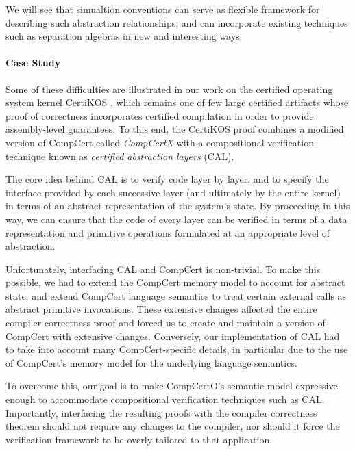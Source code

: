 We will see that simualtion conventions
can serve as flexible framework for describing
such abstraction relationships,
and can incorporate existing techniques
such as separation algebras \cite{sepalg}
in new and interesting ways.



\paragraph{Case Study} %

Some of these difficulties are illustrated
in our work on the certified operating system kernel CertiKOS \cite{dscal15},
which remains one of few large certified artifacts
whose proof of correctness incorporates certified compilation
in order to provide assembly-level guarantees.
To this end,
the CertiKOS proof combines a modified version of CompCert
called \emph{CompCertX}
with a compositional verification technique
known as \emph{certified abstraction layers} (CAL).

The core idea behind CAL is to verify code layer by layer,
and to specify the interface provided by each successive layer
(and ultimately by the entire kernel)
in terms of an abstract representation of the system's state.
By proceeding in this way,
we can ensure that the code of every layer
can be verified in terms of
a data representation and primitive operations
formulated at an appropriate level of abstraction.

Unfortunately,
interfacing CAL and CompCert is non-trivial.
To make this possible,
we had to extend the CompCert memory model to account for abstract state,
and extend CompCert language semantics to treat certain external calls
as abstract primitive invocations.
These extensive changes affected the entire compiler correctness proof
and forced us to create and maintain a version of CompCert with
extensive changes.
Conversely,
our implementation of CAL
had to take into account
many CompCert-specific details,
in particular due to the use of CompCert's memory model
for the underlying language semantics.

To overcome this,
our goal is to make CompCertO's semantic model
expressive enough to accommodate
compositional verification techniques such as CAL.
Importantly,
interfacing the resulting proofs
with the compiler correctness theorem
should not require any changes to the compiler,
nor should it force the verification framework
to be overly tailored to that application.


